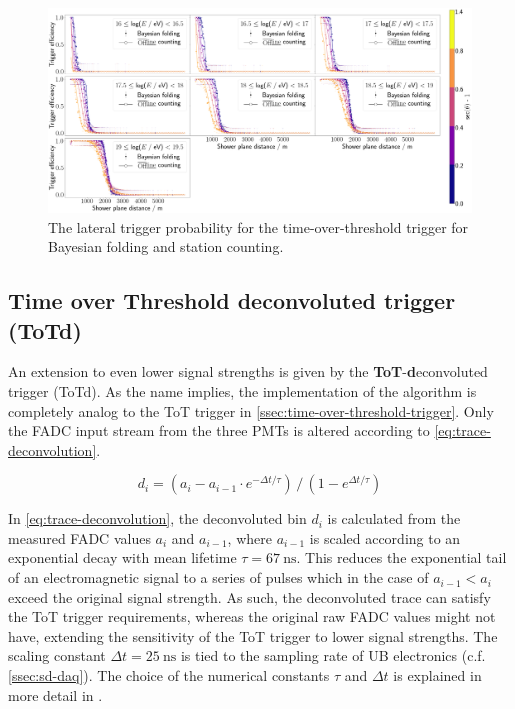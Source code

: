 \begin{figure}
	\centering
	\includegraphics[width=\textwidth]{./plots/tot_LTP_comparison.png}
	\caption{The lateral trigger probability for the time-over-threshold trigger for Bayesian folding and \Offline station counting.} 
	\label{fig:tot-ltp-comparison}
\end{figure}

\subsection{Time over Threshold deconvoluted trigger (ToTd)}
\label{ssec:time-over-threshold-deconvoluted}

An extension to even lower signal strengths is given by the \textbf{ToT}-\textbf{d}econvoluted trigger (ToTd). As the name implies, the implementation of the 
algorithm is completely analog to the ToT trigger in \autoref{ssec:time-over-threshold-trigger}. Only the FADC input stream from the three PMTs is altered 
according to \autoref{eq:trace-deconvolution}.

\begin{equation}
    \label{eq:trace-deconvolution}
    d_i = (a_i - a_{i-1}\cdot e^{-\Delta t/\tau})\,/\,(1 - e^{\Delta t/\tau}) 
\end{equation}

In \autoref{eq:trace-deconvolution}, the deconvoluted bin $d_i$ is calculated from the measured FADC values $a_i$ and $a_{i-1}$, where $a_{i-1}$ is scaled 
according to an exponential decay with mean lifetime $\tau = \SI{67}{\nano\second}$. This reduces the exponential tail of an electromagnetic signal to a 
series of pulses which in the case of $a_{i-1} < a_i$ exceed the original signal strength. As such, the deconvoluted trace can satisfy the ToT trigger 
requirements, whereas the original raw FADC values might not have, extending the sensitivity of the ToT trigger to lower signal strengths. The scaling constant 
$\Delta t = \SI{25}{\nano\second}$ is tied to the sampling rate of UB electronics (c.f. \autoref{ssec:sd-daq}). The choice of the numerical constants $\tau$ and 
$\Delta t$ is explained in more detail in \cite{ToTtriggerIdea}.

